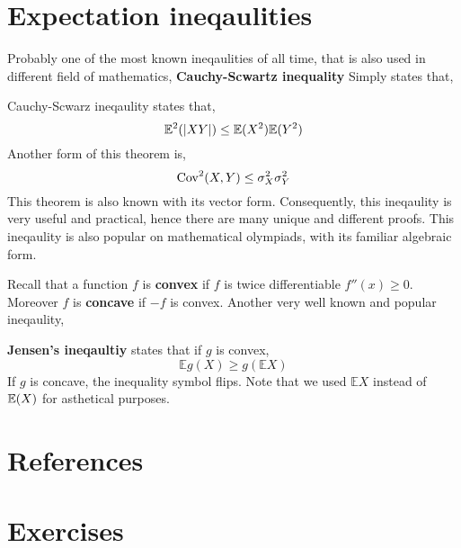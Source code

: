 \section{Expectation ineqaulities}
Probably one of the most known ineqaulities of all time, that is also used in different field of mathematics, \textbf{Cauchy-Scwartz inequality} Simply states that,
\begin{theorem} Cauchy-Scwarz ineqaulity states that,
 \[ {\mathbb{E}}^2(|XY|) \le {\mathbb{E}}(X^2){\mathbb{E}}(Y^2) \]
 Another form of this theorem is,
 \[ \operatorname{Cov}^2(X,Y) \le \sigma^2_{X}\sigma^2_{Y} \]
This theorem is also known with its vector form. Consequently, this ineqaulity is very useful and practical, hence there are many unique and different proofs. \newline
This ineqaulity is also popular on mathematical olympiads, with its familiar algebraic form.
\end{theorem}
Recall that a function $f$ is \textbf{convex} if $f$ is twice differentiable $f''(x) \ge 0 $. Moreover $f$ is \textbf{concave} if $-f$ is convex. Another very well known and popular ineqaulity,
\begin{theorem} \textbf{Jensen's ineqaultiy} states that if $g$ is convex,
    \[ \mathbb{E}g(X) \ge g(\mathbb{E}X) \]
    If $g$ is concave, the inequality symbol flips. Note that we used $\mathbb{E}X$ instead of ${\mathbb{E}}(X)$ for asthetical purposes.
\end{theorem}
\section{References}
\section{Exercises}
